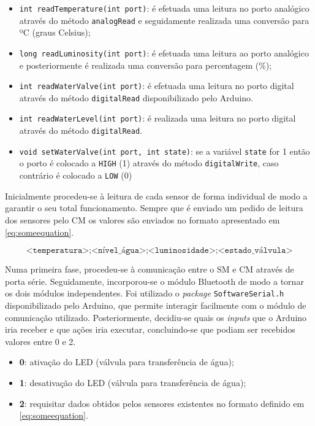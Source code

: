 \begin{itemize}
	\item \texttt{int readTemperature(int port)}: é efetuada uma leitura no porto analógico através do método \texttt{analogRead} e seguidamente realizada uma conversão para ºC (graus Celsius);
	
	\item \texttt{long readLuminosity(int port)}: é efetuada uma leitura ao porto analógico e posteriormente é realizada uma conversão para percentagem (\%); 
	
	\item \texttt{int readWaterValve(int port)}: é efetuada uma leitura no porto digital através do método \texttt{digitalRead} disponibilizado pelo Arduino.
	
	\item \texttt{int readWaterLevel(int port)}: é realizada uma leitura no porto digital através do método \texttt{digitalRead}.
	
	
	\item \texttt{void setWaterValve(int port, int state)}: se a variável \texttt{state} for 1 então o porto é colocado a \texttt{HIGH} (1) através do método \texttt{digitalWrite}, caso contrário é colocado a \texttt{LOW} (0)
	
\end{itemize}

Inicialmente procedeu-se à leitura de cada sensor de forma individual de modo a garantir o seu total funcionamento. Sempre que é enviado um pedido de leitura dos sensores pelo \acl{CM} os valores são enviados no formato apresentado em \ref{eq:someequation}.

\begin{equation} 
\label{eq:someequation}
\texttt{<temperatura>;<nível\_água>;<luminosidade>;<estado\_válvula>}
\end{equation}



Numa primeira fase, procedeu-se à comunicação entre o \acl{SM} e \acl{CM} através de porta série. Seguidamente, incorporou-se o módulo Bluetooth de modo a tornar os dois módulos independentes. Foi utilizado o  \textit{package} \texttt{SoftwareSerial.h} disponibilizado pelo Arduino, que permite interagir facilmente com o módulo de comunicação utilizado. Posteriormente, decidiu-se quais os \textit{inputs} que o Arduino iria receber e que ações iria executar, concluindo-se que podiam ser recebidos valores entre 0 e 2. 


\begin{itemize}
	\item \textbf{0}: ativação do \ac{LED} (válvula para transferência de água); 
	\item \textbf{1}: desativação do \ac{LED} (válvula para transferência de água); 
	\item \textbf{2}: requisitar dados obtidos pelos sensores existentes no formato definido em \ref{eq:someequation}. 
\end{itemize}


